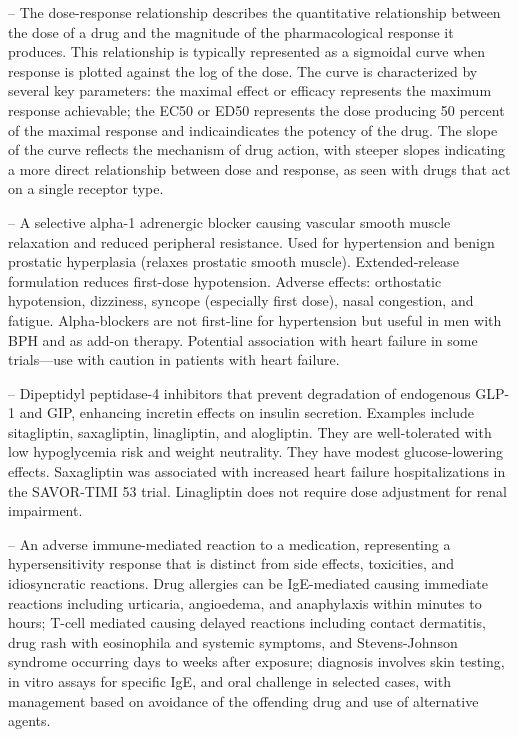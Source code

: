 -- The dose-response relationship describes the quantitative relationship between the dose of a drug and the magnitude of the pharmacological response it produces. This relationship is typically represented as a sigmoidal curve when response is plotted against the log of the dose. The curve is characterized by several key parameters: the maximal effect or efficacy represents the maximum response achievable; the EC50 or ED50 represents the dose producing 50 percent of the maximal response and indicaindicates the potency of the drug. The slope of the curve reflects the mechanism of drug action, with steeper slopes indicating a more direct relationship between dose and response, as seen with drugs that act on a single receptor type.

-- A selective alpha-1 adrenergic blocker causing vascular smooth muscle relaxation and reduced peripheral resistance. Used for hypertension and benign prostatic hyperplasia (relaxes prostatic smooth muscle). Extended-release formulation reduces first-dose hypotension. Adverse effects: orthostatic hypotension, dizziness, syncope (especially first dose), nasal congestion, and fatigue. Alpha-blockers are not first-line for hypertension but useful in men with BPH and as add-on therapy. Potential association with heart failure in some trials—use with caution in patients with heart failure.

-- Dipeptidyl peptidase-4 inhibitors that prevent degradation of endogenous GLP-1 and GIP, enhancing incretin effects on insulin secretion. Examples include sitagliptin, saxagliptin, linagliptin, and alogliptin. They are well-tolerated with low hypoglycemia risk and weight neutrality. They have modest glucose-lowering effects. Saxagliptin was associated with increased heart failure hospitalizations in the SAVOR-TIMI 53 trial. Linagliptin does not require dose adjustment for renal impairment.

-- An adverse immune-mediated reaction to a medication, representing a hypersensitivity response that is distinct from side effects, toxicities, and idiosyncratic reactions. Drug allergies can be IgE-mediated causing immediate reactions including urticaria, angioedema, and anaphylaxis within minutes to hours; T-cell mediated causing delayed reactions including contact dermatitis, drug rash with eosinophila and systemic symptoms, and Stevens-Johnson syndrome occurring days to weeks after exposure; diagnosis involves skin testing, in vitro assays for specific IgE, and oral challenge in selected cases, with management based on avoidance of the offending drug and use of alternative agents.

